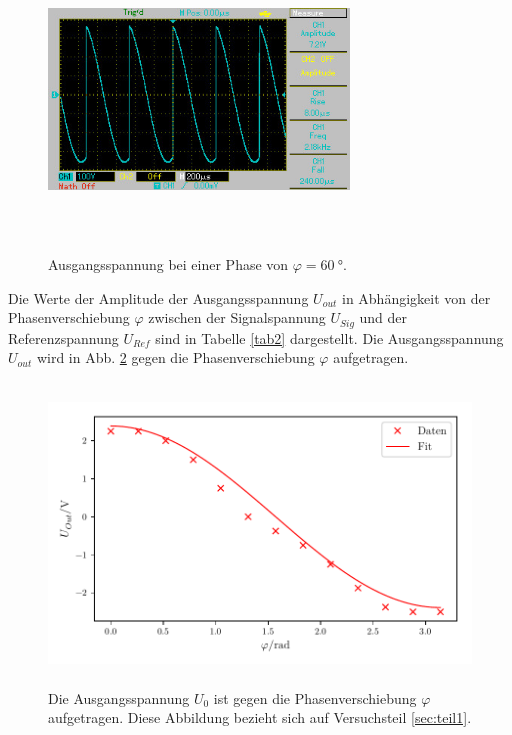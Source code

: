 \begin{figure}
    \centering
    \includegraphics[width=8cm, height=8cm]{build/5.jpg}
    \caption{Ausgangsspannung bei einer Phase von $\varphi = \SI{60}{\degree}$.}
    \label{fig:bild5}
\end{figure}

\noindent Die Werte der Amplitude der Ausgangsspannung $U_{out}$ in Abhängigkeit von der Phasenverschiebung $\varphi$
zwischen der Signalspannung $U_{Sig}$ und der Referenzspannung $U_{Ref}$
sind in Tabelle \ref{tab2} dargestellt. Die Ausgangsspannung $U_{out}$ wird in Abb. \ref{fig:plot2} gegen die Phasenverschiebung $\varphi$
aufgetragen.


\begin{figure}
    \centering
    \includegraphics[width=12cm, height=8cm]{build/plot2.pdf}
    \caption{Die Ausgangsspannung $U_{0}$ ist gegen die Phasenverschiebung $\varphi$ aufgetragen.
    Diese Abbildung bezieht sich auf Versuchsteil \ref{sec:teil1}.}
    \label{fig:plot2}
\end{figure}

